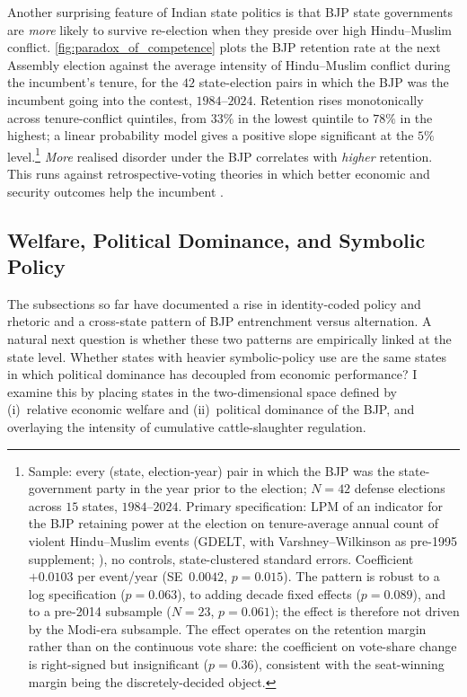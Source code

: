 Another surprising feature of
Indian state politics is that BJP state governments are \emph{more} likely
to survive re-election when they preside over high Hindu--Muslim conflict.
\autoref{fig:paradox_of_competence} plots the BJP retention rate at the
next Assembly election against the average intensity of Hindu--Muslim
conflict during the incumbent's tenure, for the $42$ state-election pairs
in which the BJP was the incumbent going into the contest, $1984$--$2024$.
Retention rises monotonically across tenure-conflict quintiles, from
$33\%$ in the lowest quintile to $78\%$ in the highest; a linear
probability model gives a positive slope significant at the $5\%$
level.\footnote{Sample: every (state, election-year) pair in which the BJP
was the state-government party in the year prior to the election; $N=42$
defense elections across $15$ states, $1984$--$2024$. Primary
specification: LPM of an indicator for the BJP retaining power at the
election on tenure-average annual count of violent Hindu--Muslim events
(GDELT, with Varshney--Wilkinson as pre-1995 supplement; \citealt*{varshneyEthnicConflictCivic2003}), no controls,
state-clustered standard errors. Coefficient~$+0.0103$ per event/year
(SE~$0.0042$, $p=0.015$). The pattern is robust to a log specification
($p=0.063$), to adding decade fixed effects ($p=0.089$), and to a pre-2014
subsample ($N=23$, $p=0.061$); the effect is therefore not driven by the
Modi-era subsample. The effect operates on the retention margin rather than
on the continuous vote share: the coefficient on vote-share change is
right-signed but insignificant ($p=0.36$), consistent with the
seat-winning margin being the discretely-decided object.} \emph{More}
realised disorder under the BJP correlates with \emph{higher} retention.
This runs against retrospective-voting theories in which better economic and
security outcomes help the incumbent \citep*{wilkinsonVotesViolenceElectoral2006}.

\subsection{Welfare, Political Dominance, and Symbolic Policy}
\label{subsec:voter_space}

The subsections so far have documented a rise in identity-coded policy and
rhetoric and a cross-state pattern of BJP entrenchment versus alternation.
A natural next question is whether these two patterns are empirically
linked at the state level. Whether states with heavier
symbolic-policy use are the same states in which political dominance has
decoupled from economic performance? I examine this by placing states in the
two-dimensional space defined by (i)~relative economic welfare and
(ii)~political dominance of the BJP, and overlaying the intensity of
cumulative cattle-slaughter regulation.

